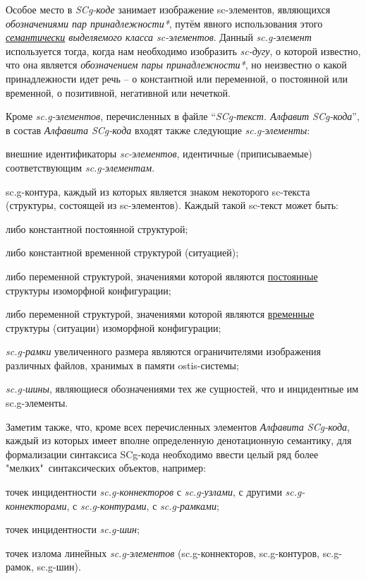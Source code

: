 \begin{SCn}
{	Особое место в \textit{SCg-коде} занимает изображение sc-элементов, являющихся \textit{обозначениями пар принадлежности*}, путём явного использования этого \textit {\uline{семантически} выделяемого класса sc-элементов}.
	Данный \textit{sc.g-элемент} используется тогда, когда нам необходимо изобразить \textit{sc-дугу}, о которой известно, что она является \textit{обозначением пары принадлежности*}, но неизвестно о какой принадлежности идет речь -- о константной или переменной, о постоянной или временной, о позитивной, негативной или нечеткой.
	
	Кроме\textit{ sc.g-элементов}, перечисленных в файле ``\textit{SCg-текст. Алфавит SCg-кода}'', в состав \textit{Алфавита SCg-кода} входят также следующие \textit{sc.g-элементы}:
	\begin{scnitemize}
		\item внешние идентификаторы \textit{sc-элементов}, идентичные (приписываемые) соответствующим \textit{sc.g-элементам}.
		\item sc.g-контура, каждый из которых является знаком некоторого sc-текста (структуры, состоящей из sc-элементов). Каждый такой sc-текст может быть:
		\begin{scnitemizeii}
			\item либо константной постоянной структурой;
			\item либо константной временной структурой (ситуацией);
			\item либо переменной структурой, значениями которой являются \uline{постоянные} структуры изоморфной  конфигурации;
			\item либо переменной структурой, значениями которой являются \uline{временные} структуры (ситуации) изоморфной  конфигурации;
		\end{scnitemizeii}
		
		\item \textit{sc.g-рамки} увеличенного размера являются ограничителями изображения различных файлов, хранимых в памяти ostis-системы;
		\item \textit{sc.g-шины}, являющиеся обозначениями тех же сущностей, что и инцидентные им sc.g-элементы.
	\end{scnitemize}
	
	Заметим также, что, кроме всех перечисленных элементов \textit{Алфавита SCg-кода}, каждый из которых имеет вполне определенную денотационную  семантику, для формализации синтаксиса SCg-кода необходимо ввести целый ряд более "мелких"\ синтаксических объектов, например:
	\begin{scnitemize}
		\item точек инцидентности \textit{sc.g-коннекторов} с \textit{sc.g-узлами}, с другими \textit{sc.g-коннекторами}, с \textit{sc.g-контурами}, с \textit{sc.g-рамками};
		\item точек инцидентности \textit{sc.g-шин};
		\item точек излома линейных \textit{sc.g-элементов} (sc.g-коннекторов, sc.g-контуров, sc.g-рамок, sc.g-шин).
	\end{scnitemize}
}


\end{SCn}
